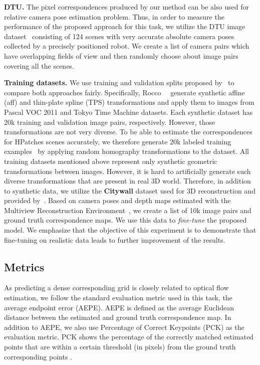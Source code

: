 \documentclass[10pt,twocolumn,letterpaper]{article}
\begin{document}
\noindent\textbf{DTU.} The pixel correspondences produced by our method can be also used for relative camera pose estimation problem. Thus, in order to measure the performance of the proposed approach for this task, we utilize the DTU image dataset~\cite{DTU} consisting of 124 scenes with very accurate absolute camera poses collected by a precisely positioned robot. We create a list of camera pairs which have overlapping fields of view and then randomly choose about  image pairs covering all the scenes.

\noindent\textbf{Training datasets.} We use training and validation splits proposed by~\cite{Rocco17} to compare both approaches fairly. Specifically, Rocco~\etal ~\cite{Rocco17} generate synthetic affine (aff) and thin-plate spline (TPS) transformations and apply them to images from Pascal VOC 2011  and Tokyo Time Machine  datasets. Each synthetic dataset has 20k training and validation image pairs, respectively. However, those transformations are not very diverse. 
To be able to estimate the correspondences for HPatches scenes accurately, we therefore generate 20k labeled training examples~\cite{DeepHomography} by applying random homography transformations to the  dataset. All training datasets mentioned above represent only synthetic geometric transformations between images. However, it is hard to artificially generate such diverse transformations that are present in real 3D world. Therefore, in addition to synthetic data, we utilize the \textbf{Citywall} dataset used for 3D reconstruction and provided by~\cite{MVE}. Based on camera poses and depth maps estimated with the Multiview Reconstruction Environment~\cite{MVE}, we create a list of 10k image pairs and ground truth correspondence maps. We use this data to \textit{fine-tune} the proposed model. We emphasize that the objective of this experiment is to demonstrate that fine-tuning on realistic data leads to further improvement of the results.

\vspace{-1mm}
\subsection{Metrics}
As predicting a dense corresponding grid is closely related to optical flow estimation, we follow the standard evaluation metric used in this task, \ie the average endpoint error (AEPE). AEPE is  defined as the average Euclidean distance between the estimated and ground truth correspondence map. In addition to AEPE, we also use Percentage of Correct Keypoints (PCK) as the evaluation metric. PCK shows the percentage of the correctly matched estimated points  that are within a certain threshold (in pixels) from the ground truth corresponding points .
\end{document}
